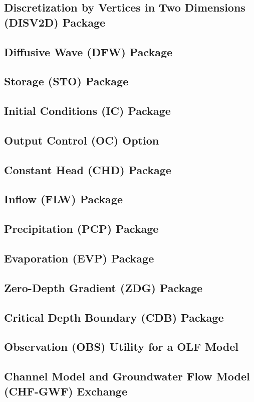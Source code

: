 \newpage
\subsection{Discretization by Vertices in Two Dimensions (DISV2D) Package}


\newpage
\subsection{Diffusive Wave (DFW) Package}


\newpage
\subsection{Storage (STO) Package}


\newpage
\subsection{Initial Conditions (IC) Package}


\newpage
\subsection{Output Control (OC) Option}


\newpage
\subsection{Constant Head (CHD) Package}


\newpage
\subsection{Inflow (FLW) Package}


\newpage
\subsection{Precipitation (PCP) Package}


\newpage
\subsection{Evaporation (EVP) Package}


\newpage
\subsection{Zero-Depth Gradient (ZDG) Package}


\newpage
\subsection{Critical Depth Boundary (CDB) Package}


\newpage
\subsection{Observation (OBS) Utility for a OLF Model}


\newpage
\subsection{Channel Model and Groundwater Flow Model (CHF-GWF) Exchange}


